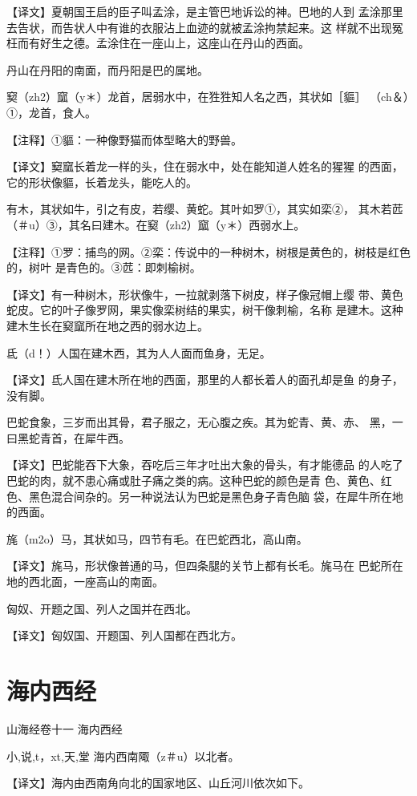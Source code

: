 \documentclass[a4paper,12pt,UTF8,twoside]{ctexbook}
\begin{document}
【译文】夏朝国王启的臣子叫孟涂，是主管巴地诉讼的神。巴地的人到 孟涂那里去告状，而告状人中有谁的衣服沾上血迹的就被孟涂拘禁起来。这 样就不出现冤枉而有好生之德。孟涂住在一座山上，这座山在丹山的西面。

丹山在丹阳的南面，而丹阳是巴的属地。

窫（zh2）窳（y＊）龙首，居弱水中，在狌狌知人名之西，其状如［貙］ （ch＆）①，龙首，食人。

【注释】①貙：一种像野猫而体型略大的野兽。

【译文】窫窳长着龙一样的头，住在弱水中，处在能知道人姓名的猩猩 的西面，它的形状像貙，长着龙头，能吃人的。

有木，其状如牛，引之有皮，若缨、黄蛇。其叶如罗①，其实如栾②， 其木若苉（＃u）③，其名曰建木。在窫（zh2）窳（y＊）西弱水上。

【注释】①罗：捕鸟的网。②栾：传说中的一种树木，树根是黄色的，树枝是红色的，树叶 是青色的。③苉：即刺榆树。

【译文】有一种树木，形状像牛，一拉就剥落下树皮，样子像冠帽上缨 带、黄色蛇皮。它的叶子像罗网，果实像栾树结的果实，树干像刺榆，名称 是建木。这种建木生长在窫窳所在地之西的弱水边上。

氐（d！）人国在建木西，其为人人面而鱼身，无足。

【译文】氐人国在建木所在地的西面，那里的人都长着人的面孔却是鱼 的身子，没有脚。

巴蛇食象，三岁而出其骨，君子服之，无心腹之疾。其为蛇青、黄、赤、 黑，一曰黑蛇青首，在犀牛西。

【译文】巴蛇能吞下大象，吞吃后三年才吐出大象的骨头，有才能德品 的人吃了巴蛇的肉，就不患心痛或肚子痛之类的病。这种巴蛇的颜色是青 色、黄色、红色、黑色混合间杂的。另一种说法认为巴蛇是黑色身子青色脑 袋，在犀牛所在地的西面。

旄（m2o）马，其状如马，四节有毛。在巴蛇西北，高山南。

【译文】旄马，形状像普通的马，但四条腿的关节上都有长毛。旄马在 巴蛇所在地的西北面，一座高山的南面。

匈奴、开题之国、列人之国并在西北。

【译文】匈奴国、开题国、列人国都在西北方。

\chapter{海内西经}

山海经卷十一 海内西经

小,说,t，xt,天,堂
海内西南陬（z＃u）以北者。

【译文】海内由西南角向北的国家地区、山丘河川依次如下。
\end{document}
